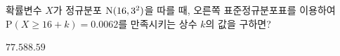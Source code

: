 \noindent\begin{minipage}[t]{0.58\linewidth}\vspace{0pt}\raggedright 확률변수 $X$가 정규분포 $\mathrm{N}(16{,}\mkern3mu\mathopen{}3^2)$을 따를 때, 오른쪽 표준정규분포표를 이용하여 $\mathrm{P}(X\ge 16+k)=0.0062$를 만족시키는 상수 $k$의 값을 구하면?\end{minipage}\hfill\begin{minipage}[t]{0.4\linewidth}\vspace{0pt}\centering \resizebox{\ifdim\width>\linewidth\linewidth\else\width\fi}{!}{}\end{minipage}\par
\begin{choicesii}{$7$}{$7.5$}{$8$}{$8.5$}{$9$}\end{choicesii}
